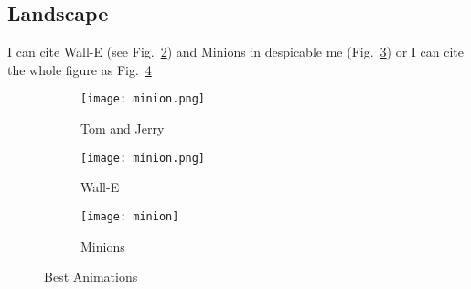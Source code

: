 \begin{landscape}

\section{Landscape}
I can cite Wall-E (see Fig.~\ref{fig:WallE}) and Minions in despicable me (Fig.~\ref{fig:Minnion}) or I can cite the whole figure as Fig.~\ref{fig:animations}


\begin{figure}
  \centering
  \begin{subfigure}[b]{0.3\textwidth}
    \texttt{[image: minion.png]}
    \caption{Tom and Jerry}
    \label{fig:TomJerry}   
  \end{subfigure}             
  \begin{subfigure}[b]{0.3\textwidth}
    \texttt{[image: minion.png]}
    \caption{Wall-E}
    \label{fig:WallE}
  \end{subfigure}             
  \begin{subfigure}[b]{0.3\textwidth}
    \texttt{[image: minion]}
    \caption{Minions}
    \label{fig:Minnion}
  \end{subfigure}
  \caption{Best Animations}
  \label{fig:animations}
\end{figure}

\end{landscape}
